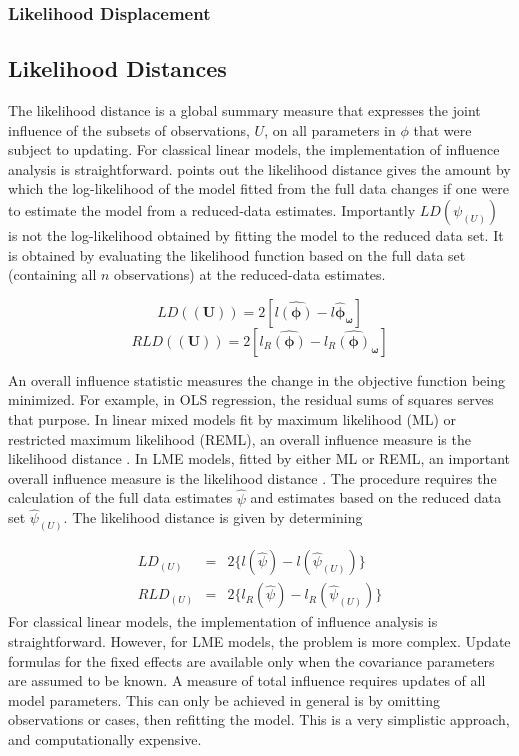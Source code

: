 \documentclass[12pt, a4paper]{report}
\theoremstyle{plain}
\theoremstyle{definition}
\theoremstyle{remark}
\begin{document}
\subsubsection*{Likelihood Displacement}

\subsection{Likelihood Distances}

The  likelihood distance is a global summary measure that expresses the joint influence of the subsets of observations, $U$, on all parameters in $\phi$ that were subject to updating. For classical linear models, the implementation of influence analysis is straightforward. \citet{schab} points out the likelihood distance gives the amount by which the log-likelihood of the model fitted from the full data changes if one were
to estimate the model from a reduced-data estimates. Importantly $LD(\psi_{(U)})$ is not the log-likelihood obtained by fitting the model to the reduced data set. It is obtained by evaluating the likelihood function based on the full data set (containing all $n$ observations) at the reduced-data estimates.


\[  LD(\boldsymbol{(U)})= 2[l\boldsymbol{\hat{(\phi)}} - l\boldsymbol{\hat{\phi}_\omega} ] \]
\[  RLD(\boldsymbol{(U)})= 2[ l_R\boldsymbol{\hat{(\phi)}} - l_R\boldsymbol{\hat{(\phi)}_\omega} ] \]


An overall influence statistic measures the change in the objective function being minimized. For example, in
OLS regression, the residual sums of squares serves that purpose. In linear mixed models fit by
 maximum likelihood (ML) or  restricted maximum likelihood (REML), an overall influence measure is the  likelihood distance \citep{cook}. In LME models, fitted by either ML or REML, an important overall
influence measure is the likelihood distance \citep{cook82}. The  procedure requires the calculation of the full data estimates
$\hat{\psi}$ and estimates based on the reduced data set  $\hat{\psi}_{(U)}$. The likelihood distance is given by
determining


\begin{eqnarray}
LD_{(U)} &=& 2\{l(\hat{\psi}) - l( \hat{\psi}_{(U)}) \}\\
RLD_{(U)} &=& 2\{l_{R}(\hat{\psi}) - l_{R}(\hat{\psi}_{(U)})\}
\end{eqnarray}
For classical linear models, the implementation of influence analysis is straightforward.
However, for LME models, the problem is more complex. Update formulas for the fixed effects are available only when the covariance parameters are assumed to be known. A measure of total influence requires updates of all model parameters. This can only be achieved in general is by omitting observations or cases, then refitting the model. This is a very simplistic approach, and computationally expensive.
\end{document}
